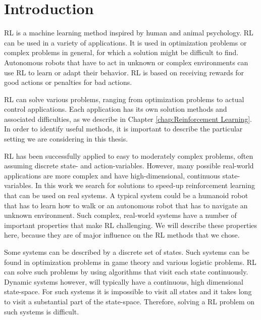 \chapter{Introduction}\label{chap:Introduction}

\ac{RL} is a machine learning method inspired by human and animal psychology. \ac{RL} can be used in a variety of applications. It is used in optimization problems or complex problems in general, for which a solution might be difficult to find. Autonomous robots that have to act in unknown or complex environments can use \ac{RL} to learn or adapt their behavior. \ac{RL} is based on receiving rewards for good actions or penalties for bad actions. 

\ac{RL} can solve various problems, ranging from optimization problems to actual control applications. Each application has its own solution methods and associated difficulties, as we describe in Chapter \ref{chap:Reinforcement Learning}. In order to identify useful methods, it is important to describe the particular setting we are considering in this thesis.

\ac{RL} has been successfully applied to easy to moderately complex problems, often assuming discrete state- and action-variables. However, many possible real-world applications are more complex and have high-dimensional, continuous state-variables. In this work we search for solutions to speed-up reinforcement learning that can be used on real systems. A typical system could be a humanoid robot that has to learn how to walk or an autonomous robot that has to navigate an unknown environment. Such complex, real-world systems have a number of important properties that make \ac{RL} challenging. We will describe these properties here, because they are of major influence on the \ac{RL} methods that we chose.

Some systems can be described by a discrete set of states. Such systems can be found in optimization problems in game theory and various logistic problems. \ac{RL} can solve such problems by using algorithms that visit each state continuously. Dynamic systems however, will typically have a continuous, high dimensional state-space. For such systems it is impossible to visit all states and it takes long to visit a substantial part of the state-space. Therefore, solving a \ac{RL} problem on such systems is difficult.


